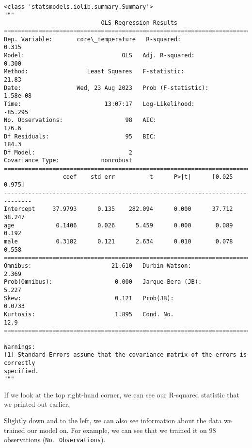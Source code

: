\documentclass[11pt]{article}
\makeatletter
\newcommand{\boxspacing}{\kern\kvtcb@left@rule\kern\kvtcb@boxsep}
\newcommand{\prompt}[4]{
        {\ttfamily\llap{{\color{#2}[#3]:\hspace{3pt}#4}}\vspace{-\baselineskip}}
    }
\makeatother
\begin{document}
            \begin{tcolorbox}[breakable, size=fbox, boxrule=.5pt, pad at break*=1mm, opacityfill=0]
\prompt{Out}{outcolor}{7}{\boxspacing}
\begin{Verbatim}[commandchars=\\\{\}]
<class 'statsmodels.iolib.summary.Summary'>
"""
                            OLS Regression Results
==============================================================================
Dep. Variable:       core\_temperature   R-squared:                       0.315
Model:                            OLS   Adj. R-squared:                  0.300
Method:                 Least Squares   F-statistic:                     21.83
Date:                Wed, 23 Aug 2023   Prob (F-statistic):           1.58e-08
Time:                        13:07:17   Log-Likelihood:                -85.295
No. Observations:                  98   AIC:                             176.6
Df Residuals:                      95   BIC:                             184.3
Df Model:                           2
Covariance Type:            nonrobust
==============================================================================
                 coef    std err          t      P>|t|      [0.025      0.975]
------------------------------------------------------------------------------
Intercept     37.9793      0.135    282.094      0.000      37.712      38.247
age            0.1406      0.026      5.459      0.000       0.089       0.192
male           0.3182      0.121      2.634      0.010       0.078       0.558
==============================================================================
Omnibus:                       21.610   Durbin-Watson:                   2.369
Prob(Omnibus):                  0.000   Jarque-Bera (JB):                5.227
Skew:                           0.121   Prob(JB):                       0.0733
Kurtosis:                       1.895   Cond. No.                         12.9
==============================================================================

Warnings:
[1] Standard Errors assume that the covariance matrix of the errors is correctly
specified.
"""
\end{Verbatim}
\end{tcolorbox}
        
    If we look at the top right-hand corner, we can see our R-squared
statistic that we printed out earlier.

Slightly down and to the left, we can also see information about the
data we trained our model on. For example, we can see that we trained it
on 98 observations (\texttt{No.\ Observations}).
\end{document}
